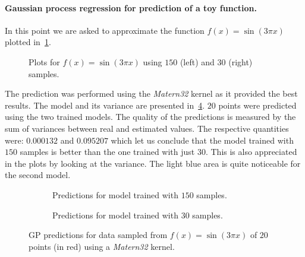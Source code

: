 \paragraph{Gaussian process regression for prediction of a toy function.} In
this point we are asked to approximate the function $f(x) = \sin(3\pi x)$
plotted in~\cref{fig_ftestsamples}.

\begin{figure}
  \centering
  
  \caption{Plots for $f(x) = \sin(3\pi x)$ using $150$ (left) and $30$ (right)
  samples.}
  \label{fig_ftestsamples}
\end{figure}

The prediction was performed using the \emph{Matern32} kernel as it provided the
best results. The model and its variance are presented
in~\cref{fig_gppredftest}. $20$ points were predicted using the two trained
models. The quality of the predictions is measured by the sum of variances
between real and estimated values. The respective quantities were: $0.000132$
and $0.095207$ which let us conclude that the model trained with $150$ samples
is better than the one trained with just $30$. This is also appreciated in the
plots by looking at the variance. The light blue area is quite noticeable for
the second model.

\begin{figure}
  \begin{subfigure}[h]{.5\linewidth}
    
    \caption{Predictions for model trained with $150$ samples.}
    \label{fig_predftest}
  \end{subfigure}
  \begin{subfigure}[h]{.5\linewidth}
    
    \caption{Predictions for model trained with $30$ samples.}
    \label{fig_predftest2}
  \end{subfigure}
  \caption{GP predictions for data sampled from $f(x) = \sin(3\pi x)$ of $20$
   points (in red) using a \emph{Matern32} kernel.}
  \label{fig_gppredftest}
\end{figure}
